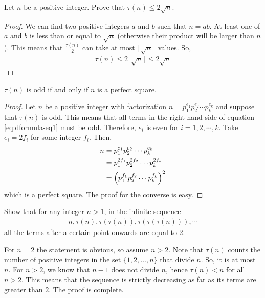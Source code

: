 		\begin{theorem}\label{prop:tau(n)<2sqrt(n)}
			Let $n$ be a positive integer. Prove that $\tau(n) \leq 2 \sqrt n$.
		\end{theorem}

		\begin{proof}
			We can find two positive integers $a$ and $b$ such that $n=ab$. At least one of $a$ and $b$ is less than or equal to $\sqrt n$ (otherwise their product will be larger than $n$). This means that $\frac{\tau(n)}{2}$ can take at most $\lfloor \sqrt n \rfloor$ values. So,
				\begin{align*}
					\tau(n) \leq 2 \lfloor \sqrt n \rfloor \leq 2 \sqrt n
				\end{align*}
		\end{proof}

		\begin{theorem}
			$\tau(n)$ is odd if and only if $n$ is a perfect square.
		\end{theorem}

		\begin{proof}
			Let $n$ be a positive integer with factorization $n=p_1^{e_1}p_2^{e_2}\cdots p_k^{e_k}$ and suppose that $\tau(n)$ is odd. This means that all terms in the right hand side of equation \ref{eq:dformula-eq1} must be odd. Therefore, $e_i$ is even for $i=1,2,\cdots,k$. Take $e_i = 2f_i$ for some integer $f_i$. Then,
				\begin{align*}
					n &= p_1^{e_1}p_2^{e_2}\cdots p_k^{e_k}\\
					&= p_1^{2f_1}p_2^{2f_2}\cdots p_k^{2f_k}\\
					&= \left(p_1^{f_1}p_2^{f_2}\cdots p_k^{f_k}\right)^2
				\end{align*}
			which is a perfect square. The proof for the converse is easy.
		\end{proof}

		\begin{problem}
			Show that for any integer $n>1$, in the infinite sequence
				\begin{align*}
					n, \tau(n), \tau(\tau(n)), \tau(\tau(\tau(n))),\cdots
				\end{align*}
			all the terms after a certain point onwards are equal to $2$. %
		\end{problem}

		\begin{solution}
			For $n=2$ the statement is obvious, so assume $n >2$. Note that $\tau(n)$ counts the number of positive integers in the set $\{1,2,\ldots,n\}$ that divide $n$. So, it is at most $n$. For $n>2$, we know that $n-1$ does not divide $n$,  hence $\tau(n) < n$ for all $n>2$. This means that the sequence is strictly decreasing as far as its terms are greater than $2$. The proof is complete.
		\end{solution}

